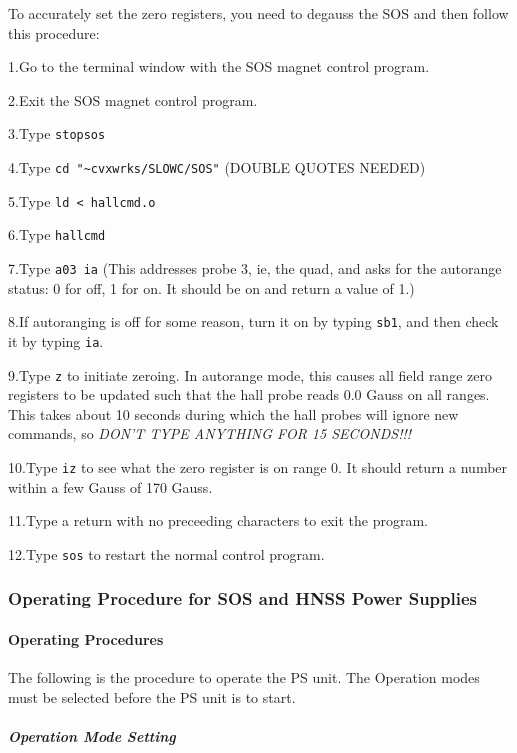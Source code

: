 To accurately set the zero registers, you need to degauss the SOS
and then follow this procedure:
\begin{description}
\item{1.}Go to the terminal window with the SOS magnet control program.
\item{2.}Exit the SOS magnet control program.
\item{3.}Type \verb|stopsos|
\item{4.}Type \verb|cd "~cvxwrks/SLOWC/SOS"| (DOUBLE QUOTES NEEDED)
\item{5.}Type \verb|ld < hallcmd.o|
\item{6.}Type \verb|hallcmd|
\item{7.}Type \verb|a03 ia| (This addresses probe 3, ie, the quad, and asks for
     the autorange status: 0 for off, 1 for on. It should be on and
     return a value of 1.)
\item{8.}If autoranging is off for some reason,
     turn it on by typing \verb|sb1|, and then check it by typing \verb|ia|.
\item{9.}Type \verb|z| to initiate zeroing. In autorange mode, this causes
    all field range zero registers to be updated such that the
    hall probe reads 0.0 Gauss on all ranges. This takes about 10
    seconds during which the hall probes will ignore new commands,
    so {\em DON'T TYPE ANYTHING FOR 15 SECONDS!!!}
\item{10.}Type \verb|iz| to see what the zero register is on range 0. It should
    return a number within a few Gauss of 170 Gauss.
\item{11.}Type a return with no preceeding characters to exit the program.
\item{12.}Type \verb|sos| to restart the normal control program.
\end{description}

\subsubsection{Operating Procedure for SOS and HNSS Power Supplies}

\paragraph {Operating Procedures}

The following is the procedure to operate the PS unit.
The Operation modes must be selected before the PS unit is to
start.

\subparagraph {Operation Mode Setting}

